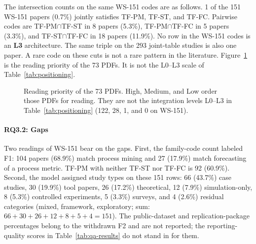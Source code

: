 The intersection counts on the same WS-151 codes are as follows.
1 of the 151 WS-151 papers (0.7\%) jointly satisfies TF-PM, TF-ST, and TF-FC.
Pairwise codes are TF-PM$\cap$TF-ST in 8 papers (5.3\%), TF-PM$\cap$TF-FC
in 5 papers (3.3\%), and TF-ST$\cap$TF-FC in 18
papers (11.9\%). No row in the WS-151 codes is an
\textbf{L3} architecture. The same triple on the 293 joint-table studies is also one
paper. A rare code on these cuts is not a rare pattern in the literature.
Figure~\ref{fig:pdf-integration-priority} is the reading priority of the 73
PDFs. It is not the L0--L3 scale of Table~\ref{tab:positioning}.

\begin{figure}[p]
\centering
{}
\caption{Reading priority of the 73 PDFs. High, Medium, and Low order those
PDFs for reading. They are not the integration levels L0--L3 in
Table~\ref{tab:positioning} (122, 28, 1, and 0 on WS-151).}
\label{fig:pdf-integration-priority}
\end{figure}

\paragraph{RQ3.2: Gaps} Two readings of WS-151 bear on the gaps.
First, the family-code count labeled F1: 104 papers (68.9\%) match process
mining and 27 (17.9\%) match forecasting of a process metric. TF-PM with
neither TF-ST nor TF-FC is 92 (60.9\%).
Second, the model assigned study types on these 151 rows: 66
(43.7\%) case studies, 30 (19.9\%) tool papers, 26 (17.2\%) theoretical,
12 (7.9\%) simulation-only, 8 (5.3\%) controlled experiments, 5 (3.3\%)
surveys, and 4 (2.6\%) residual categories (mixed, framework, exploratory;
sum: $66+30+26+12+8+5+4 = 151$). The public-dataset and
replication-package percentages belong to the withdrawn F2 and are not
reported; the reporting-quality scores in Table~\ref{tab:qa-results} do
not stand in for them.

